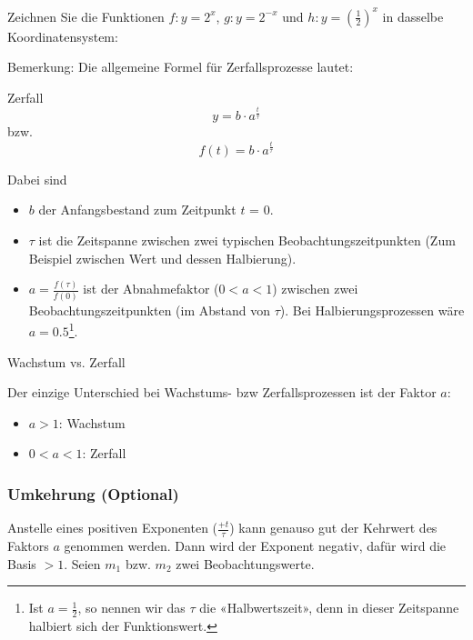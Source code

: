 Zeichnen Sie die Funktionen $f: y=2^x$, $g: y=2^{-x}$ und $h: y=\left(\frac12\right)^x$ in dasselbe Koordinatensystem:


Bemerkung: 
\newpage
Die allgemeine Formel für Zerfallsprozesse lautet:

\begin{definition}{Zerfall}{}
$$y = b\cdot{}a^{\frac{t}{\tau}}$$
  bzw.
  $$f(t) = b\cdot{}a^{\frac{t}{\tau}}$$
\end{definition}


Dabei sind
\begin{itemize}
\item $b$ der Anfangsbestand zum Zeitpunkt $t$ = 0.
\item $\tau$ ist die Zeitspanne zwischen zwei typischen Beobachtungszeitpunkten (Zum Beispiel zwischen Wert und dessen Halbierung).
\item $a=\frac{f(\tau)}{f(0)}$ ist der Abnahmefaktor ($0<a<1$)
  zwischen zwei Beobachtungszeitpunkten (im Abstand von $\tau$). Bei
  Halbierungsprozessen \zB wäre $a=0.5$\footnote{Ist $a=\frac12$, so
  nennen wir das $\tau$ die «Halbwertszeit», denn
  in dieser Zeitspanne halbiert sich der Funktionswert.}.
\end{itemize}

\begin{bemerkung}{Wachstum vs. Zerfall}{}

  Der einzige Unterschied bei Wachstums- bzw Zerfallsprozessen ist der
  Faktor $a$:

  \begin{itemize}
  \item $a>1$: Wachstum
  \item $0<a<1$: Zerfall
    \end{itemize}
  
  \end{bemerkung}
\newpage

\subsubsection{Umkehrung (Optional)}
Anstelle eines  positiven Exponenten ($\frac{+t}{\tau}$) kann genauso
gut der Kehrwert des Faktors $a$ genommen werden. Dann wird der
Exponent negativ, dafür wird die Basis $> 1$. Seien $m_1$ bzw. $m_2$
zwei Beobachtungswerte.

